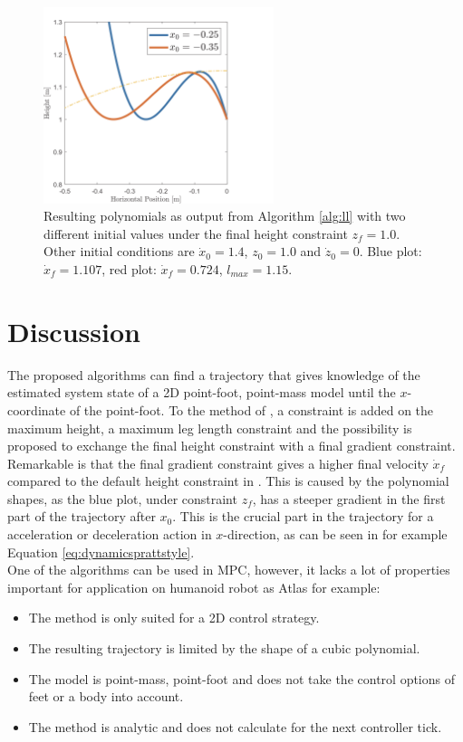 \begin{figure}[h]
\centering
\includegraphics[width=0.6\textwidth]{STYLESTUFF/polynomialLengthViz.png}
\caption{Resulting polynomials as output from Algorithm \ref{alg:ll} with two different initial values under the final height constraint $z_f=1.0$. Other initial conditions are $\dot{x}_0=1.4$, $z_0=1.0$ and $\dot{z}_0=0$. Blue plot: $\dot{x}_f=1.107$, red plot: $\dot{x}_f=0.724$, $l_{max}=1.15$. }
\label{fig:pollength}
\end{figure}
\section{Discussion}
The proposed algorithms can find a trajectory that gives knowledge of the estimated system state of a \ac{2D} point-foot, point-mass model until the $x$-coordinate of the point-foot. To the method of \cite{koolen2016balance}, a constraint is added on the maximum height, a maximum leg length constraint and the possibility is proposed to exchange the final height constraint with a final gradient constraint. Remarkable is that the final gradient constraint gives a higher final velocity $\dot{x}_f$ compared to the default height constraint in . This is caused by the polynomial shapes, as the blue plot, under constraint $z_f$, has a steeper gradient in the first part of the trajectory after $x_0$. This is the crucial part in the trajectory for a acceleration or deceleration action in $x$-direction, as can be seen in for example Equation \eqref{eq:dynamicsprattstyle}. \\
One of the algorithms can be used in \ac{MPC}, however, it lacks a lot of properties important for application on humanoid robot as Atlas for example:
\begin{itemize}
	\item The method is only suited for a \ac{2D} control strategy.
	\item The resulting trajectory is limited by the shape of a cubic polynomial.
	\item The model is point-mass, point-foot and does not take the control options of feet or a body into account.
	\item The method is analytic and does not calculate for the next controller tick.
\end{itemize}
